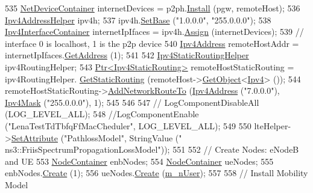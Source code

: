 \begin{DoxyCode}
535   \hyperlink{classns3_1_1NetDeviceContainer}{NetDeviceContainer} internetDevices = p2ph.\hyperlink{classns3_1_1PointToPointHelper_ab9162fea3e88722666fed1106df1f9ec}{Install} (pgw, remoteHost);
536   \hyperlink{classns3_1_1Ipv4AddressHelper}{Ipv4AddressHelper} ipv4h;
537   ipv4h.\hyperlink{classns3_1_1Ipv4AddressHelper_acf7b16dd25bac67e00f5e25f90a9a035}{SetBase} (\textcolor{stringliteral}{"1.0.0.0"}, \textcolor{stringliteral}{"255.0.0.0"});
538   \hyperlink{classns3_1_1Ipv4InterfaceContainer}{Ipv4InterfaceContainer} internetIpIfaces = ipv4h.\hyperlink{classns3_1_1Ipv4AddressHelper_af8e7f4a1a7e74c00014a1eac445a27af}{Assign} (internetDevices);
539   \textcolor{comment}{// interface 0 is localhost, 1 is the p2p device}
540   \hyperlink{classns3_1_1Ipv4Address}{Ipv4Address} remoteHostAddr = internetIpIfaces.\hyperlink{classns3_1_1Ipv4InterfaceContainer_ae63208dcd222be986822937ee4aa828c}{GetAddress} (1);
541 
542   \hyperlink{classns3_1_1Ipv4StaticRoutingHelper}{Ipv4StaticRoutingHelper} ipv4RoutingHelper;
543   \hyperlink{classns3_1_1Ptr}{Ptr<Ipv4StaticRouting>} remoteHostStaticRouting = ipv4RoutingHelper.
      \hyperlink{classns3_1_1Ipv4StaticRoutingHelper_a731206e50d305695dac7fb2ef963a4bb}{GetStaticRouting} (remoteHost->\hyperlink{classns3_1_1Object_a13e18c00017096c8381eb651d5bd0783}{GetObject}<\hyperlink{classns3_1_1Ipv4}{Ipv4}> ());
544   remoteHostStaticRouting->\hyperlink{classns3_1_1Ipv4StaticRouting_a8bf5eaa7ba49fe33c78c70d5560b6c39}{AddNetworkRouteTo} (\hyperlink{classns3_1_1Ipv4Address}{Ipv4Address} (\textcolor{stringliteral}{"7.0.0.0"}), 
      \hyperlink{classns3_1_1Ipv4Mask}{Ipv4Mask} (\textcolor{stringliteral}{"255.0.0.0"}), 1);
545 
546 
547 \textcolor{comment}{//   LogComponentDisableAll (LOG\_LEVEL\_ALL);}
548   \textcolor{comment}{//LogComponentEnable ("LenaTestTdTbfqFfMacCheduler", LOG\_LEVEL\_ALL);}
549    
550   lteHelper->\hyperlink{classns3_1_1ObjectBase_ac60245d3ea4123bbc9b1d391f1f6592f}{SetAttribute} (\textcolor{stringliteral}{"PathlossModel"}, StringValue (\textcolor{stringliteral}{"
      ns3::FriisSpectrumPropagationLossModel"}));
551 
552   \textcolor{comment}{// Create Nodes: eNodeB and UE}
553   \hyperlink{classns3_1_1NodeContainer}{NodeContainer} enbNodes;
554   \hyperlink{classns3_1_1NodeContainer}{NodeContainer} ueNodes;
555   enbNodes.\hyperlink{classns3_1_1NodeContainer_a787f059e2813e8b951cc6914d11dfe69}{Create} (1);
556   ueNodes.\hyperlink{classns3_1_1NodeContainer_a787f059e2813e8b951cc6914d11dfe69}{Create} (\hyperlink{classLenaTdTbfqFfMacSchedulerTestCase2_a6c234ef9d9e91fe6aa53403eb32db14c}{m\_nUser});
557 
558   \textcolor{comment}{// Install Mobility Model}

\end{DoxyCode}
